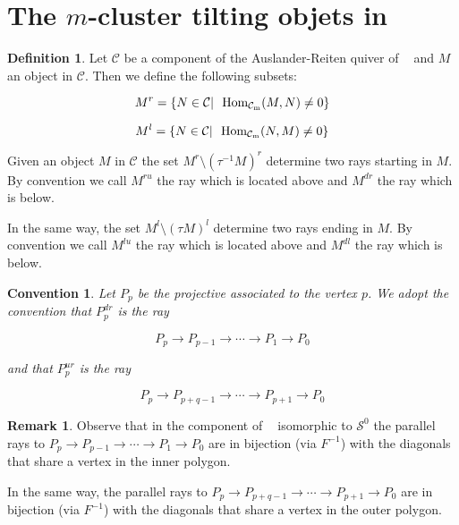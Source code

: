 \documentclass{amsart}
\theoremstyle{plain}
\newtheorem{convencion}[teo]{\bf{Convention}}
\theoremstyle{definition}
\newtheorem{defi}[teo]{Definition}
\newtheorem{obs}[teo]{Remark}
\begin{document}
\section{The $m$-cluster tilting objets in ${\mathop{\mathcal{C}_m}\nolimits}$  }

\begin{defi}
Let   $\mathcal{C}$  be a  component of the  Auslander-Reiten quiver of  ${\mathop{\mathcal{C}_m}\nolimits}$ and   $M$ an object in  $\mathcal{C}$. Then we define the following subsets:

$$M^r=\{N\in \mathcal{C} | \ \ {\mathop{\rm Hom_{\mathcal{C}_m}}\nolimits}(M,N)\neq
0 \}$$

$$M^l=\{N\in \mathcal{C} |  \ \  {\mathop{\rm Hom_{\mathcal{C}_m}}\nolimits}(N,M)\neq
0 \}$$

Given an object $M$ in  $\mathcal{C}$  the set  $M^r \setminus (\tau^{-1}M)^r$ determine two rays starting in  $M$. By convention we call $M^{ru}$ the ray  which is located above and $M^{dr}$ the ray  which is  below.

In the same way, the set $M^l \setminus (\tau M)^l$ determine two rays   ending in $M$. By convention we call $M^{lu}$ the ray  which is located above and $M^{dl}$ the ray  which is  below.\\
\end{defi}

\begin{convencion}
Let $P_p$ be the projective associated to the vertex $p$. We adopt the convention that $P_p^{dr}$ is the ray

  $$P_p\rightarrow P_{p-1}\rightarrow \cdots \rightarrow P_1 \rightarrow P_0$$

 and that  $P_p^{ur}$ is the ray

   $$P_p\rightarrow
P_{p+q-1}\rightarrow \cdots \rightarrow P_{p+1} \rightarrow P_0$$

\end{convencion}

\begin{obs}
\textnormal{
Observe that in the component of  ${\mathop{\mathcal{C}_m}\nolimits}$ isomorphic  to $\mathcal{S}^0$ the
parallel rays to $P_p\rightarrow P_{p-1}\rightarrow \cdots
\rightarrow P_1 \rightarrow P_0$  are in  bijection (via  $F^{-1}$) with the diagonals that  share a vertex in the inner polygon. }\

\textnormal{  In the same way, the
parallel rays to $P_p\rightarrow P_{p+q-1}\rightarrow \cdots \rightarrow P_{p+1} \rightarrow P_0$ are in  bijection (via  $F^{-1}$)  with the diagonals that  share a vertex in the outer polygon.}
\end{obs}
\end{document}

